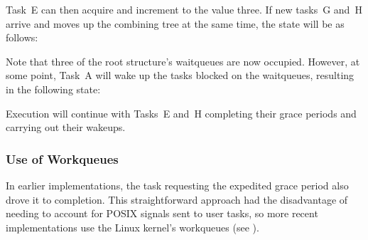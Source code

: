 Task~E can then acquire  and increment
 to the value three.
If new tasks~G and~H arrive
and moves up the combining tree at the same time, the state will be as
follows:

\begin{center}
\end{center}

Note that three of the root  structure's waitqueues are now
occupied.
However, at some point, Task~A will wake up the tasks blocked
on the  waitqueues, resulting in the following state:

\begin{center}
\end{center}

Execution will continue with Tasks~E and~H completing their grace
periods and carrying out their wakeups.

\QuickQuizEnd

\subsubsection{Use of Workqueues}

In earlier implementations, the task requesting the expedited grace
period also drove it to completion.
This straightforward approach had
the disadvantage of needing to account for POSIX signals sent to user
tasks, so more recent implementations use the Linux kernel's
workqueues (see ).

